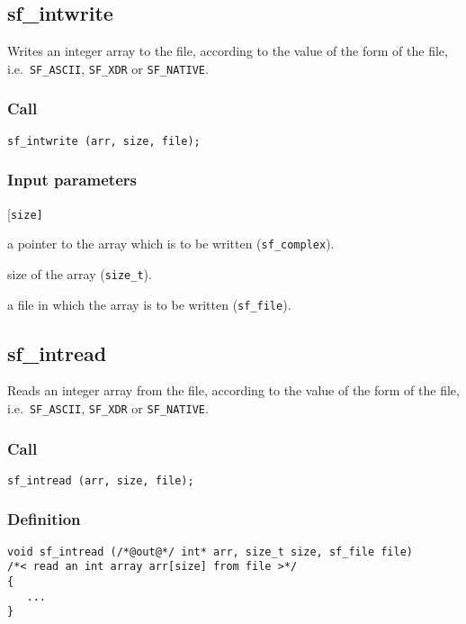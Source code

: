 \subsection{{sf\_intwrite}}
Writes an integer array to the file, according to the value of the form of the file, i.e.~\texttt{SF\_ASCII}, \texttt{SF\_XDR} or \texttt{SF\_NATIVE}.        

\subsubsection*{Call}
\begin{verbatim}sf_intwrite (arr, size, file);\end{verbatim}

\subsubsection*{Input parameters}
\begin{desclist}{\tt }{\quad}[\tt size]
   \setlength\itemsep{0pt}
   \item[arr] a pointer to the array which is to be written (\texttt{sf\_complex}). 
   \item[size] size of the array (\texttt{size\_t}). 
   \item[file] a file in which the array is to be written (\texttt{sf\_file}).
\end{desclist}




\subsection{{sf\_intread}}
Reads an integer array from the file, according to the value of the form of the file, i.e.~\texttt{SF\_ASCII}, \texttt{SF\_XDR} or \texttt{SF\_NATIVE}.        

\subsubsection*{Call}
\begin{verbatim}sf_intread (arr, size, file);\end{verbatim}

\subsubsection*{Definition}
\begin{verbatim}
void sf_intread (/*@out@*/ int* arr, size_t size, sf_file file)
/*< read an int array arr[size] from file >*/
{
   ...
}
\end{verbatim}

